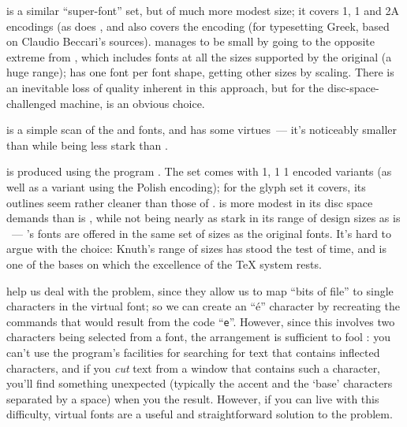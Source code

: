  is a similar ``super-font'' set, but of much more
modest size; it covers 1, 1 and 2{A}
encodings (as does , and also covers the 
encoding (for typesetting Greek, based on Claudio Beccari's \MF{}
sources).   manages to be small by going to the
opposite extreme from , which includes fonts at all
the sizes supported by the original  (a huge range);
 has one font per font shape, getting other sizes by
scaling.  There is an inevitable loss of quality inherent in this
approach, but for the disc-space-challenged machine, 
is an obvious choice.

 is a simple scan of the  and 
fonts, and has some virtues~--- it's noticeably smaller than
 while being less stark than .

  is produced using the
program .  The
  set comes with 1, 1
1 encoded variants (as well as a variant using the Polish
 encoding); for the glyph set it covers, its outlines seem
rather cleaner than those of .  
 is more modest in its disc space demands than is
, while not being nearly as stark in its range of
design sizes as is ~---  
's fonts are offered in the same set of sizes as the
original  fonts.  It's hard to argue with the choice:
Knuth's range of sizes has stood the test of time, and is one of the
bases on which the excellence of the \TeX{} system rests.

 help us deal with the problem,
since they allow us to map ``bits of  file'' to single
characters in the virtual font; so we can create an ``\'e'' character
by recreating the  commands that would result from the code
``\texttt{e}''.  However, since this involves two characters being
selected from a font, the arrangement is sufficient to fool
 : you can't use the program's
facilities for searching for text that contains inflected characters,
and if you \emph{cut} text from a window that contains such a
character, you'll find something unexpected (typically the accent and
the `base' characters separated by a space) when you 
the result.  However, if you can live with this difficulty, virtual
fonts are a useful and straightforward solution to the problem.

